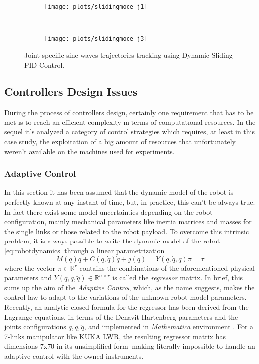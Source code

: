 \begin{figure}[H]
	\centering
	\begin{subfigure}[t]{\textwidth}
		\texttt{[image: plots/slidingmode\_j1]}
	\end{subfigure}
	\\
	\begin{subfigure}[t]{\textwidth}
		\texttt{[image: plots/slidingmode\_j3]}
	\end{subfigure}
	\caption{Joint-specific sine waves trajectories tracking using Dynamic Sliding PID Control.}
\end{figure}

\subsection{Controllers Design Issues}
During the process of controllers design, certainly one requirement that has to be met is to reach an efficient complexity in terms of computational resources. In the sequel it's analyzed a category of control strategies which requires, at least in this case study, the exploitation of a big amount of resources that unfortunately weren't available on the machines used for experiments.
\subsubsection{Adaptive Control}
In this section it has been assumed that the dynamic model of the robot is perfectly known at any instant of time, but, in practice, this can't be always true. In fact there exist some model uncertainties depending on the robot configuration, mainly mechanical parameters like inertia matrices and masses for the single links or those related to the robot payload. To overcome this intrinsic problem, it is always possible to write the dynamic model of the robot \eqref{eq:robotdynamics} through a linear parametrization
\begin{equation}
M(q)\ddot{q} + C(q,\dot{q})\dot{q} + g(q) = Y(q,\dot{q},\ddot{q})\pi = \tau
\end{equation}
where the vector $\pi\in\mathbb{R}^r$ contains the combinations of the aforementioned physical parameters and $Y(q,\dot{q},\ddot{q})\in\mathbb{R}^{n\times r}$ is called the \textit{regressor} matrix. In brief, this sums up the aim of the \textit{Adaptive Control}, which, as the name suggests, makes the control law to adapt to the variations of the unknown robot model parameters. Recently, an analytic closed formula for the regressor has been derived from the Lagrange equations, in terms of the Denavit-Hartenberg parameters and the joints configurations  $q,\dot{q},\ddot{q}$, and implemented in \textit{Mathematica} environment \cite{gabiccini09}. For a 7-links manipulator like KUKA LWR, the resulting regressor matrix has dimensions $7$x$70$ in its unsimplified form, making literally impossible to handle an adaptive control with the owned instruments.
